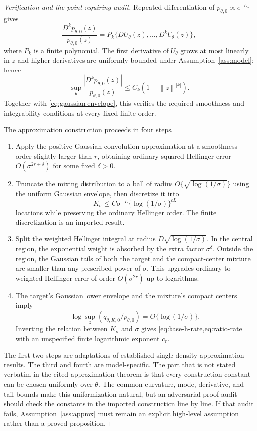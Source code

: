 \documentclass[11pt]{article}
\theoremstyle{definition}
\newcommand{\norm}[1]{\left\lVert #1\right\rVert}
\begin{document}
\begin{proof}[Verification and the point requiring audit]
Repeated differentiation of $p_{\theta,0}\propto e^{-U_\theta}$ gives
\[
\frac{D^kp_{\theta,0}(z)}{p_{\theta,0}(z)}
=P_k\{DU_\theta(z),\ldots,D^kU_\theta(z)\},
\]
where $P_k$ is a finite polynomial. The first derivative of $U_\theta$ grows at most linearly in $z$ and higher derivatives are uniformly bounded under Assumption~\ref{ass:model}; hence
\[
\sup_{\theta}\frac{|D^kp_{\theta,0}(z)|}{p_{\theta,0}(z)}
\le C_k(1+\norm z^{|k|}).
\]
Together with \cref{eq:gaussian-envelope}, this verifies the required smoothness and integrability conditions at every fixed finite order.

The approximation construction proceeds in four steps.
\begin{enumerate}[label=\arabic*.]
\item Apply the positive Gaussian-convolution approximation at a smoothness order slightly larger than $r$, obtaining ordinary squared Hellinger error $O(\sigma^{2r+\delta})$ for some fixed $\delta>0$.
\item Truncate the mixing distribution to a ball of radius $O\{\sqrt{\log(1/\sigma)}\}$ using the uniform Gaussian envelope, then discretize it into
\[
K_\sigma
\le C\sigma^{-L}\{\log(1/\sigma)\}^{cL}
\]
locations while preserving the ordinary Hellinger order. The finite discretization is an imported result.
\item Split the weighted Hellinger integral at radius $D\sqrt{\log(1/\sigma)}$. In the central region, the exponential weight is absorbed by the extra factor $\sigma^\delta$. Outside the region, the Gaussian tails of both the target and the compact-center mixture are smaller than any prescribed power of $\sigma$. This upgrades ordinary to weighted Hellinger error of order $O(\sigma^{2r})$ up to logarithms.
\item The target's Gaussian lower envelope and the mixture's compact centers imply
\[
\log\sup_z(q_{\theta,K,0}/p_{\theta,0})
=O\{\log(1/\sigma)\}.
\]
Inverting the relation between $K_\sigma$ and $\sigma$ gives \cref{eq:base-h-rate,eq:ratio-rate} with an unspecified finite logarithmic exponent $c_r$.
\end{enumerate}

The first two steps are adaptations of established single-density approximation results. The third and fourth are model-specific. The part that is not stated verbatim in the cited approximation theorem is that every construction constant can be chosen uniformly over $\theta$. The common curvature, mode, derivative, and tail bounds make this uniformization natural, but an adversarial proof audit should check the constants in the imported construction line by line. If that audit fails, Assumption~\ref{ass:approx} must remain an explicit high-level assumption rather than a proved proposition.
\end{proof}
\end{document}
